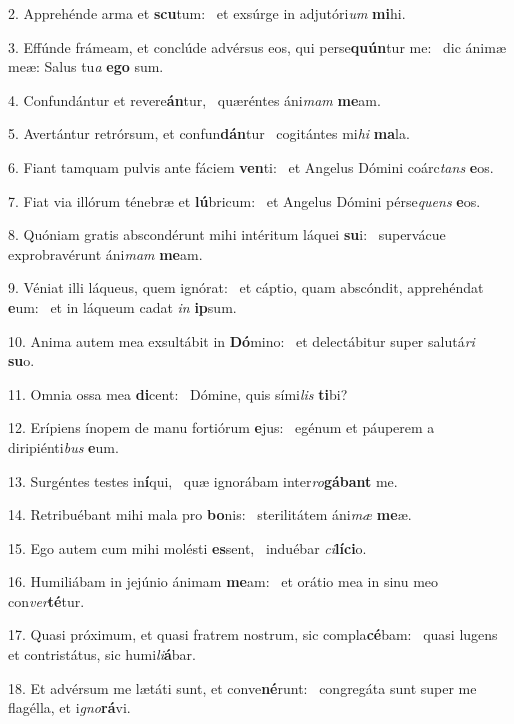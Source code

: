 2. Apprehénde arma et \textbf{scu}tum: \ast\  et exsúrge in adjutóri\textit{um} \textbf{mi}hi.\

3. Effúnde frámeam, et conclúde advérsus eos, qui perse\textbf{quún}tur me: \ast\  dic ánimæ meæ: Salus tu\textit{a} \textbf{e}\textbf{go} sum.\

4. Confundántur et revere\textbf{án}tur, \ast\  quæréntes áni\textit{mam} \textbf{me}am.\

5. Avertántur retrórsum, et confun\textbf{dán}tur \ast\  cogitántes mi\textit{hi} \textbf{ma}la.\

6. Fiant tamquam pulvis ante fáciem \textbf{ven}ti: \ast\  et Angelus Dómini coárc\textit{tans} \textbf{e}os.\

7. Fiat via illórum ténebræ et \textbf{lú}bricum: \ast\  et Angelus Dómini pérse\textit{quens} \textbf{e}os.\

8. Quóniam gratis abscondérunt mihi intéritum láquei \textbf{su}i: \ast\  supervácue exprobravérunt áni\textit{mam} \textbf{me}am.\

9. Véniat illi láqueus, quem ignórat: \dag\  et cáptio, quam abscóndit, apprehéndat \textbf{e}um: \ast\  et in láqueum cadat \textit{in} \textbf{ip}sum.\

10. Anima autem mea exsultábit in \textbf{Dó}mino: \ast\  et delectábitur super salutá\textit{ri} \textbf{su}o.\

11. Omnia ossa mea \textbf{di}cent: \ast\  Dómine, quis sími\textit{lis} \textbf{ti}bi?\

12. Erípiens ínopem de manu fortiórum \textbf{e}jus: \ast\  egénum et páuperem a diripiénti\textit{bus} \textbf{e}um.\

13. Surgéntes testes in\textbf{í}qui, \ast\  quæ ignorábam inter\textit{ro}\textbf{gá}\textbf{bant} me.\

14. Retribuébant mihi mala pro \textbf{bo}nis: \ast\  sterilitátem áni\textit{mæ} \textbf{me}æ.\

15. Ego autem cum mihi molésti \textbf{es}sent, \ast\  induébar \textit{ci}\textbf{lí}\textbf{ci}o.\

16. Humiliábam in jejúnio ánimam \textbf{me}am: \ast\  et orátio mea in sinu meo con\textit{ver}\textbf{té}tur.\

17. Quasi próximum, et quasi fratrem nostrum, sic compla\textbf{cé}bam: \ast\  quasi lugens et contristátus, sic humi\textit{li}\textbf{á}bar.\

18. Et advérsum me lætáti sunt, et conve\textbf{né}runt: \ast\  congregáta sunt super me flagélla, et i\textit{gno}\textbf{rá}vi.\

